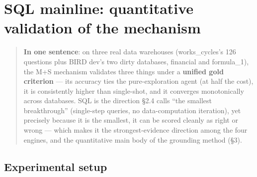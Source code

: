 \documentclass[11pt]{article}
\begin{document}
\section{SQL mainline: quantitative validation of the mechanism}

\begin{quote}
\textbf{In one sentence}: on three real data warehouses (works\_cycles's 126 questions plus BIRD dev's two dirty databases, financial and formula\_1), the M+S mechanism validates three things under a \textbf{unified gold criterion} --- its accuracy ties the pure-exploration agent (at half the cost), it is consistently higher than single-shot, and it converges monotonically across databases. SQL is the direction \S{}2.4 calls ``the smallest breakthrough'' (single-step queries, no data-computation iteration), yet precisely because it is the smallest, it can be scored cleanly as right or wrong --- which makes it the strongest-evidence direction among the four engines, and the quantitative main body of the grounding method (\S{}3).
\end{quote}

\subsection{Experimental setup}
\end{document}
